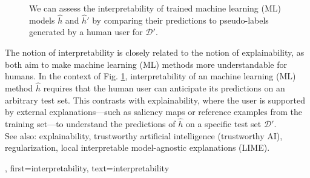 {{{\begin{figure}[H]
\begin{center}
 			\caption{We can assess the interpretability of trained machine learning (ML) models 
 			$\hat{h}$ and $\hat{h}'$ by comparing their predictions 
			to pseudo-labels generated by a human user for $\mathcal{D}'$. 
			\label{fig_aug_simulatability_dict}}
 			\end{center}
	 	\end{figure} 
 	 	The notion of interpretability is closely related to the notion of explainability, 
 	 	as both aim to make machine learning (ML) methods more understandable for humans. 
		In the context of Fig. \ref{fig_aug_simulatability_dict}, interpretability of an machine learning (ML) 
	 	method $\hat{h}$ requires that the human user can anticipate its predictions 
	 	on an arbitrary test set. This contrasts with explainability, where the user is supported by 
	 	external explanations—such as saliency maps or reference examples from the training set—to 
		understand the predictions of $\hat{h}$ on a specific test set $\mathcal{D}'$. 
	 	\\ 
	 	See also: explainability, trustworthy artificial intelligence (trustworthy AI), regularization, local interpretable model-agnostic explanations (LIME). },
	first={interpretability},
 	text={interpretability}
}

}
